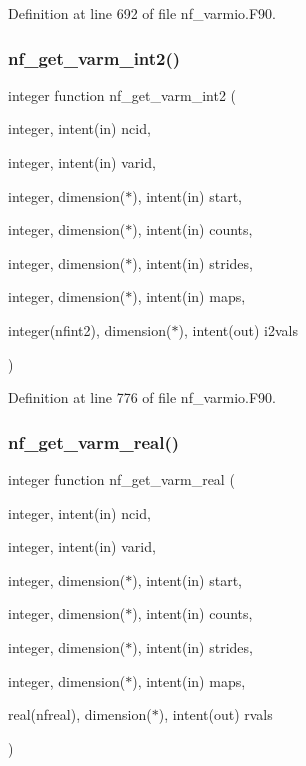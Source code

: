 Definition at line 692 of file nf\+\_\+varmio.\+F90.

\mbox{\label{nf__varmio_8F90_aec08c30b85b865f26a55da47e1afc5e1}} 
\subsubsection{\texorpdfstring{nf\+\_\+get\+\_\+varm\+\_\+int2()}{nf\_get\_varm\_int2()}}
{\footnotesize\ttfamily integer function nf\+\_\+get\+\_\+varm\+\_\+int2 (\begin{DoxyParamCaption}\item[{integer, intent(in)}]{ncid,  }\item[{integer, intent(in)}]{varid,  }\item[{integer, dimension($\ast$), intent(in)}]{start,  }\item[{integer, dimension($\ast$), intent(in)}]{counts,  }\item[{integer, dimension($\ast$), intent(in)}]{strides,  }\item[{integer, dimension($\ast$), intent(in)}]{maps,  }\item[{integer(nfint2), dimension($\ast$), intent(out)}]{i2vals }\end{DoxyParamCaption})}



Definition at line 776 of file nf\+\_\+varmio.\+F90.

\mbox{\label{nf__varmio_8F90_a0317452afd6ff0b14d3f2c98d47de670}} 
\subsubsection{\texorpdfstring{nf\+\_\+get\+\_\+varm\+\_\+real()}{nf\_get\_varm\_real()}}
{\footnotesize\ttfamily integer function nf\+\_\+get\+\_\+varm\+\_\+real (\begin{DoxyParamCaption}\item[{integer, intent(in)}]{ncid,  }\item[{integer, intent(in)}]{varid,  }\item[{integer, dimension($\ast$), intent(in)}]{start,  }\item[{integer, dimension($\ast$), intent(in)}]{counts,  }\item[{integer, dimension($\ast$), intent(in)}]{strides,  }\item[{integer, dimension($\ast$), intent(in)}]{maps,  }\item[{real(nfreal), dimension($\ast$), intent(out)}]{rvals }\end{DoxyParamCaption})}



